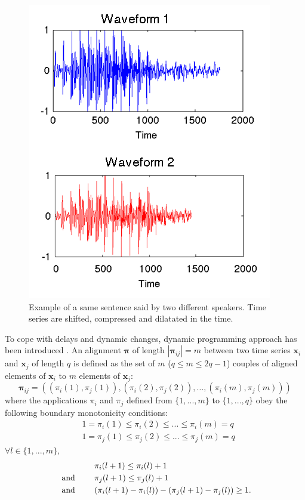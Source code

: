 \begin{figure}[h!]
\centering
\includegraphics[width=0.45\linewidth]{images/Voice_Example2}
\caption[Example of a same sentence said by two different speakers.]{Example of a same sentence said by two different speakers. Time series are shifted, compressed and dilatated in the time.}
\label{fig:Voice_Example}
\end{figure}
To cope with delays and dynamic changes, dynamic programming approach has been introduced \cite{Berndt1994a}. An alignment $\boldsymbol{\pi}$ of length $|\boldsymbol{\pi}_{ij}|=m$ between two time series $\textbf{x}_i$ and $\textbf{x}_j$ of length $q$ is defined as the set of $m$ ($q \leq m \leq 2q-1$) couples of aligned elements of $\textbf{x}_i$ to $m$ elements of $\textbf{x}_j$:
\begin{equation}
\boldsymbol{\pi}_{ij} = 
\left(  
(\pi_i(1),\pi_j(1)), 
(\pi_i(2),\pi_j(2)), 
\ldots,
(\pi_i(m),\pi_j(m))
\right) 
\end{equation}
\noindent where the applications $\pi_i$ and $\pi_j$ defined from $\{1, ..., m\}$ to $\{1, ..., q\}$ obey the following boundary monotonicity conditions: 
\begin{align}
& 1 = \pi_i(1) \leq \pi_i(2) \leq ... \leq \pi_i(m) = q \\
& 1 = \pi_j(1) \leq \pi_j(2) \leq ... \leq \pi_j(m) = q 
\end{align}
$\forall l \in \{1, ..., m\}$, 
\begin{align}
& \pi_i(l+1) \leq \pi_i(l)+1 \\
\text{  and  \qquad} & \pi_j(l+1) \leq \pi_j(l)+1 \\
\text{  and  \qquad} & ( \pi_i(l+1)-\pi_i(l) ) - ( \pi_j(l+1)-\pi_j(l)) \geq 1 . 
\end{align}

